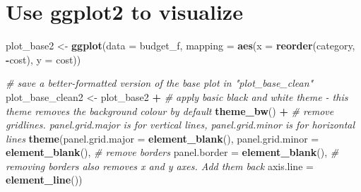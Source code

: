 \documentclass[
]{article}
\newenvironment{Shaded}{\begin{snugshade}}{\end{snugshade}}
\newcommand{\CommentTok}[1]{\textcolor[rgb]{0.56,0.35,0.01}{\textit{#1}}}
\newcommand{\DataTypeTok}[1]{\textcolor[rgb]{0.13,0.29,0.53}{#1}}
\newcommand{\KeywordTok}[1]{\textcolor[rgb]{0.13,0.29,0.53}{\textbf{#1}}}
\newcommand{\NormalTok}[1]{#1}
\newcommand{\OperatorTok}[1]{\textcolor[rgb]{0.81,0.36,0.00}{\textbf{#1}}}
\newcommand{\StringTok}[1]{\textcolor[rgb]{0.31,0.60,0.02}{#1}}
\begin{document}
\hypertarget{use-ggplot2-to-visualize}{%
\section{Use ggplot2 to visualize}\label{use-ggplot2-to-visualize}}

\begin{Shaded}
\begin{Highlighting}[]
\NormalTok{plot_base2 <-}\StringTok{ }\KeywordTok{ggplot}\NormalTok{(}\DataTypeTok{data =}\NormalTok{ budget_f, }\DataTypeTok{mapping =} \KeywordTok{aes}\NormalTok{(}\DataTypeTok{x =} \KeywordTok{reorder}\NormalTok{(category, }\OperatorTok{-}\NormalTok{cost), }\DataTypeTok{y =}\NormalTok{ cost))}

\CommentTok{# save a better-formatted version of the base plot in "plot_base_clean"}
\NormalTok{plot_base_clean2 <-}\StringTok{ }\NormalTok{plot_base2 }\OperatorTok{+}\StringTok{ }
\StringTok{  }\CommentTok{# apply basic black and white theme - this theme removes the background colour by default}
\StringTok{  }\KeywordTok{theme_bw}\NormalTok{() }\OperatorTok{+}\StringTok{ }
\StringTok{  }\CommentTok{# remove gridlines. panel.grid.major is for vertical lines, panel.grid.minor is for horizontal lines}
\StringTok{  }\KeywordTok{theme}\NormalTok{(}\DataTypeTok{panel.grid.major =} \KeywordTok{element_blank}\NormalTok{(), }\DataTypeTok{panel.grid.minor =} \KeywordTok{element_blank}\NormalTok{(),}
        \CommentTok{# remove borders}
        \DataTypeTok{panel.border =} \KeywordTok{element_blank}\NormalTok{(),}
        \CommentTok{# removing borders also removes x and y axes. Add them back}
        \DataTypeTok{axis.line =} \KeywordTok{element_line}\NormalTok{())}


\end{Highlighting}
\end{Shaded}
\end{document}
